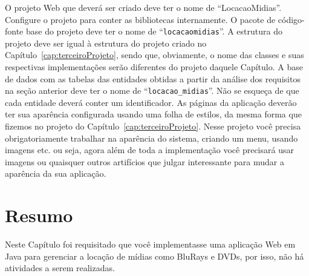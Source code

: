 O projeto Web que deverá ser criado deve ter o nome de ``LocacaoMidias''. Configure o projeto para conter as bibliotecas internamente. O pacote de código-fonte base do projeto deve ter o nome de ``\texttt{locacaomidias}''. A estrutura do projeto deve ser igual à estrutura do projeto criado no Capítulo~\ref{cap:terceiroProjeto}, sendo que, obviamente, o nome das classes e suas respectivas implementações serão diferentes do projeto daquele Capítulo. A base de dados com as tabelas das entidades obtidas a partir da análise dos requisitos na seção anterior deve ter o nome de ``\texttt{locacao\_midias}''. Não se esqueça de que cada entidade deverá conter um identificador. As páginas da aplicação deverão ter sua aparência configurada usando uma folha de estilos, da mesma forma que fizemos no projeto do Capítulo~\ref{cap:terceiroProjeto}. Nesse projeto você precisa obrigatoriamente trabalhar na aparência do sistema, criando um menu, usando imagens etc. ou seja, agora além de toda a implementação você precisará usar imagens ou quaisquer outros artifícios que julgar interessante para mudar a aparência da sua aplicação.


\section{Resumo}

Neste Capítulo foi requisitado que você implementasse uma aplicação Web em Java para gerenciar a locação de mídias como BluRays e DVDs, por isso, não há atividades a serem realizadas.
